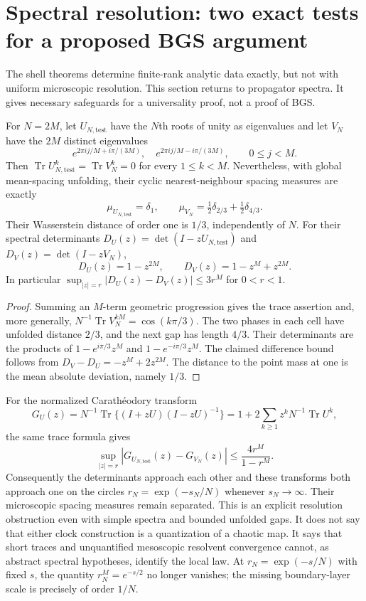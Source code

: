 \section{Spectral resolution: two exact tests for a proposed BGS argument}
\label{sec:spectral-resolution}
The shell theorems determine finite-rank analytic data exactly, but not with
uniform microscopic resolution. This section returns to propagator spectra.
It gives necessary safeguards for a universality proof, not a proof of BGS.

\begin{proposition}
For $N=2M$, let $U_{N,\mathrm{test}}$ have the $N$th roots of unity as eigenvalues and let $V_N$
have the $2M$ distinct eigenvalues
\[
 e^{2\pi i j/M+i\pi/(3M)},\quad e^{2\pi i j/M-i\pi/(3M)},
 \qquad 0\le j<M.
\]
Then $\operatorname{Tr}U_{N,\mathrm{test}}^k=\operatorname{Tr}V_N^k=0$ for every
$1\le k<M$. Nevertheless, with global mean-spacing unfolding, their cyclic
nearest-neighbour spacing measures are exactly
\[
 \mu_{U_{N,\mathrm{test}}}=\delta_1,\qquad
 \mu_{V_N}=\tfrac12\delta_{2/3}+\tfrac12\delta_{4/3}.
\]
Their Wasserstein distance of order one is $1/3$, independently of $N$.
For their spectral determinants $D_U(z)=\det(I-zU_{N,\mathrm{test}})$ and $D_V(z)=\det(I-zV_N)$,
\[
 D_U(z)=1-z^{2M},\qquad D_V(z)=1-z^M+z^{2M}.
\]
In particular $\sup_{|z|=r}|D_U(z)-D_V(z)|\le3r^M$ for $0<r<1$.
\end{proposition}
\begin{proof}
Summing an $M$-term geometric progression gives the trace assertion and,
more generally, $N^{-1}\operatorname{Tr}V_N^{kM}=\cos(k\pi/3)$.
The two phases in each cell have unfolded distance $2/3$, and the next gap
has length $4/3$. Their determinants are the products of
$1-e^{i\pi/3}z^M$ and $1-e^{-i\pi/3}z^M$. The claimed difference bound
follows from $D_V-D_U=-z^M+2z^{2M}$. The distance to the point mass at one
is the mean absolute deviation, namely $1/3$.
\end{proof}

For the normalized Carath\'eodory transform
\[
 G_U(z)=N^{-1}\operatorname{Tr}\{(I+zU)(I-zU)^{-1}\}
       =1+2\sum_{k\ge1}z^kN^{-1}\operatorname{Tr}U^k,
\]
the same trace formula gives
\[
 \sup_{|z|=r}|G_{U_{N,\mathrm{test}}}(z)-G_{V_N}(z)|
       \le\frac{4r^M}{1-r^M}.
\]
Consequently the determinants approach each other and these transforms both
approach one on the circles $r_N=\exp(-s_N/N)$ whenever $s_N\to\infty$.
Their microscopic spacing measures remain separated. This is an explicit
resolution obstruction even with simple spectra and bounded unfolded gaps.
It does not say that either clock construction is a quantization of a
chaotic map. It says that short traces and unquantified mesoscopic resolvent
convergence cannot, as abstract spectral hypotheses, identify the local law.
At $r_N=\exp(-s/N)$ with fixed $s$, the quantity $r_N^M=e^{-s/2}$ no longer
vanishes; the missing boundary-layer scale is precisely of order $1/N$.

